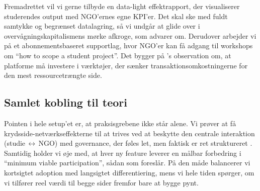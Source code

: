 Fremadrettet vil vi gerne tilbyde en data-light effektrapport, der visualiserer studerendes output med NGO'ernes egne KPI'er. Det skal ske med fuldt samtykke og begrænset datalagring, så vi undgår at glide over i overvågningskapitalismens mørke afkroge, som \citet{Zuboff2019} advarer om. Derudover arbejder vi på et abonnementsbaseret supportlag, hvor NGO'er kan få adgang til workshops om ``how to scope a student project''. Det bygger på \citet{HagiuWright2013}'s observation om, at platforme må investere i værktøjer, der sænker transaktionsomkostningerne for den mest ressourcetrængte side.

\subsection*{Samlet kobling til teori}
Pointen i hele setup'et er, at praksisgrebene ikke står alene. Vi prøver at få krydsside-netværkseffekterne til at trives ved at beskytte den centrale interaktion (studie\,$\leftrightarrow$\,NGO) med governance, der føles let, men faktisk er ret struktureret \citep{Choudary2016}. Samtidig holder vi øje med, at hver ny feature leverer en målbar forbedring i ``minimum viable participation'', sådan som \citet{Reillier2017} foreslår. På den måde balancerer vi kortsigtet adoption med langsigtet differentiering, mens vi hele tiden spørger, om vi tilfører reel værdi til begge sider fremfor bare at bygge pynt.
